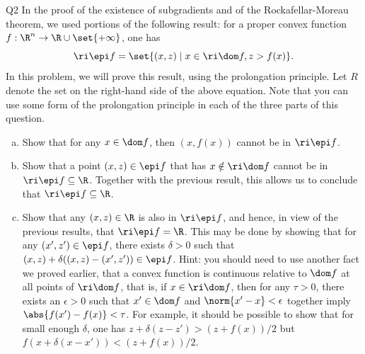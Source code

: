 \documentclass{article}
\theoremstyle{plain}
\theoremstyle{definition}
\theoremstyle{remark}
\begin{document}
\begin{problem}
    {Q2}
    In the proof of the existence of subgradients and of the Rockafellar-Moreau theorem, we used portions of the following result: for a proper convex function $f:\R^n\rightarrow \R\cup\set{+\infty}$, one has \[\ri\epi f=\set{(x,z)\mid x\in\ri\dom f, z>f(x)}.\] In this problem, we will prove this result, using the prolongation principle. Let $R$ denote the set on the right-hand side of the above equation. Note that you can use some form of the prolongation principle in each of the three parts of this question.
    \begin{enumerate}[(a)]
        \item Show that for any $x\in\dom f$, then $(x,f(x))$ cannot be in $\ri\epi f$.
        \item Show that a point $(x,z)\in\epi f$ that has $x\notin \ri\dom f$ cannot be in $\ri\epi f\subseteq \R$. Together with the previous result, this allows us to conclude that $\ri\epi f\subseteq \R$.
        \item Show that any $(x,z)\in \R$ is also in $\ri\epi f$, and hence, in view of the previous results, that $\ri\epi f= \R$. This may be done by showing that for any $(x',z')\in\epi f$, there exists $\delta>0$ such that $(x,z)+\delta((x,z)-(x',z'))\in\epi f$. Hint: you should need to use another fact we proved earlier, that a convex function is continuous relative to $\dom f$ at all points of $\ri\dom f$, that is, if $x\in \ri\dom f$, then for any $\tau>0$, there exists an $\epsilon>0$ such that $x'\in\dom f$ and $\norm{x'-x}<\epsilon$ together imply $\abs{f(x')-f(x)}<\tau$. For example, it should be possible to show that for small enough $\delta$, one has $z+\delta(z-z')>(z+f(x))/2$ but $f(x+\delta(x-x'))<(z+f(x))/2$.
    \end{enumerate}
\end{problem}
\end{document}
